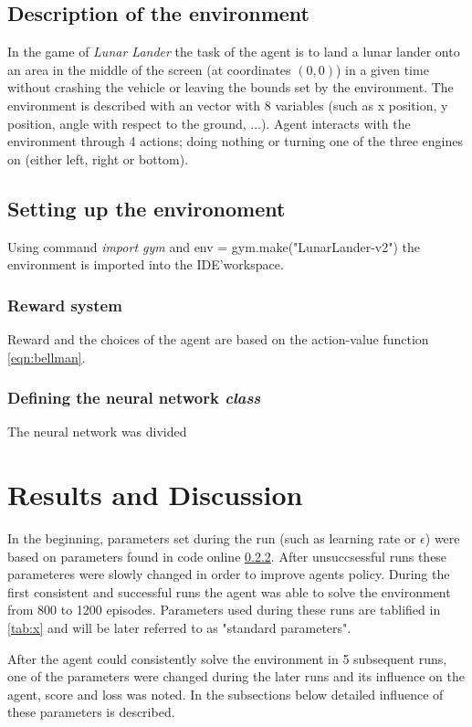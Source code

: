 \documentclass{article}
\begin{document}
\subsection{Description of the environment}
In the game of \textit{Lunar Lander} the task of the agent is to land a lunar lander onto an area in the middle of the screen (at coordinates $(0,0)$) in a given time without crashing the vehicle or leaving the bounds set by the environment. The environment is described with an vector with 8 variables (such as x position, y position, angle with respect to the ground, ...). Agent interacts with the environment through 4 actions; doing nothing or turning one of the three engines on (either left, right or bottom).

\subsection{Setting up the environoment}
Using command \textit{import gym} and env = gym.make("LunarLander-v2") the environment is imported into the IDE'\footnotemark \space workspace.

\subsubsection{Reward system}
Reward and the choices of the agent are based on the action-value function \ref{eqn:bellman}.

\subsubsection{Defining the neural network \textit{class}}
The neural network was divided

\newpage
\section*{Results and Discussion}
In the beginning, parameters set during the run (such as learning rate or $\epsilon$) were based on parameters found in code online \ref{}. After unsuccsessful runs these parameteres were slowly changed in order to improve agents policy. During the first consistent and successful runs the agent was able to solve the environment from 800 to 1200 episodes. Parameters used during these runs are tablified in \ref{tab:x} and will be later referred to as "standard parameters".

After the agent could consistently solve the environment in 5 subsequent runs, one of the parameters were changed during the later runs and its influence on the agent, score and loss was noted. In the subsections below detailed influence of these parameters is described.
\end{document}
